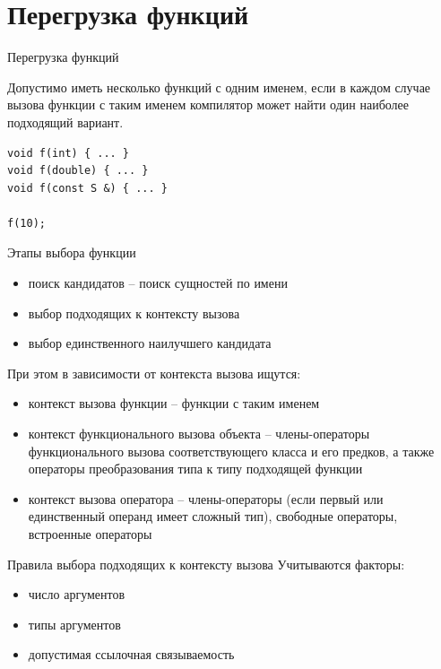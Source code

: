 \documentclass[unknownkeysallowed,xcolor=table]{beamer}
\begin{document}

\section{Перегрузка функций}

\begin{frame}[fragile]{Перегрузка функций}

Допустимо иметь несколько функций с одним именем, если в каждом случае вызова функции с таким именем компилятор может найти один наиболее подходящий вариант.

\vspace{1em}

\begin{lstlisting}
void f(int) { ... }
void f(double) { ... }
void f(const S &) { ... }

f(10);
\end{lstlisting}

\end{frame}

\begin{frame}{Этапы выбора функции}

\begin{itemize}
  \item поиск кандидатов -- поиск сущностей по имени
  \item выбор подходящих к контексту вызова
  \item выбор единственного наилучшего кандидата
\end{itemize}

\vspace{1em}

При этом в зависимости от контекста вызова ищутся:
\begin{itemize}
  \item контекст вызова функции -- функции с таким именем
  \item контекст функционального вызова объекта -- члены-операторы функционального вызова соответствующего класса и его предков, а также операторы преобразования типа к типу подходящей функции
  \item контекст вызова оператора -- члены-операторы (если первый или единственный операнд имеет сложный тип), свободные операторы, встроенные операторы
\end{itemize}

\end{frame}

\begin{frame}{Правила выбора подходящих к контексту вызова}
Учитываются факторы:

\vspace{1em}

\begin{itemize}
  \item число аргументов \vspace{1em}
  \item типы аргументов \vspace{1em}
  \item допустимая ссылочная связываемость
\end{itemize}
\end{frame}
\end{document}
